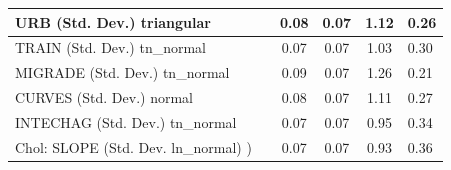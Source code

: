 \begin{table}
\begin{center}
\begin{tabular}{|l|l|c|c|c|l|}
			\hline
			URB (Std. Dev.) triangular &  & 0.08 & 0.07 & 1.12 & 0.26 \\
			\hline
			TRAIN (Std. Dev.) tn_normal &  & 0.07 & 0.07 & 1.03 & 0.30 \\
			\hline
			MIGRADE (Std. Dev.) tn_normal &  & 0.09 & 0.07 & 1.26 & 0.21 \\
			\hline
			CURVES (Std. Dev.) normal &  & 0.08 & 0.07 & 1.11 & 0.27 \\
			\hline
			INTECHAG (Std. Dev.) tn_normal &  & 0.07 & 0.07 & 0.95 & 0.34 \\
			\hline
			 Chol: SLOPE (Std. Dev. ln_normal) ) &  & 0.07 & 0.07 & 0.93 & 0.36 \\
			\hline
		\end{tabular}
	\end{center}
\end{table}